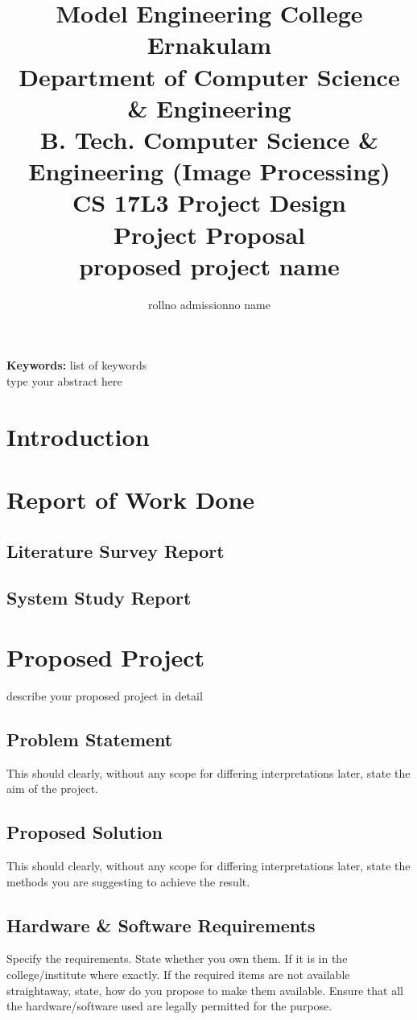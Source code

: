 \documentclass[twocolumn,10pt]{article}
\title{Model Engineering College Ernakulam
\\Department of Computer Science \& Engineering
\\B. Tech. Computer Science \& Engineering (Image Processing)
\\CS 17L3 Project Design
\\ Project Proposal
\\proposed project name
}
\author{rollno admissionno name}
\begin{document}
\maketitle
	
{\bf Keywords:}
list of keywords\\
\abstract{} 
type your abstract here
\section{\label{intro}Introduction}
\section{\label{work}Report of Work Done}
\subsection{Literature Survey Report}

\subsection{System Study Report}
\section{Proposed Project}
describe your proposed project in detail
\subsection{\label{ps}Problem Statement}
This should clearly, without any scope for differing interpretations later, state the aim of the project.

\subsection{Proposed Solution}
This should clearly, without any scope for differing interpretations later, state the methods you are suggesting to achieve the result.
\subsection{Hardware \& Software Requirements}
Specify the requirements. State whether you own them. If it is in the college/institute
 where exactly. If the required items are not available straightaway, state, how do you propose to make them available. 
Ensure that all the hardware/software used are legally permitted for the purpose.
\end{document}
